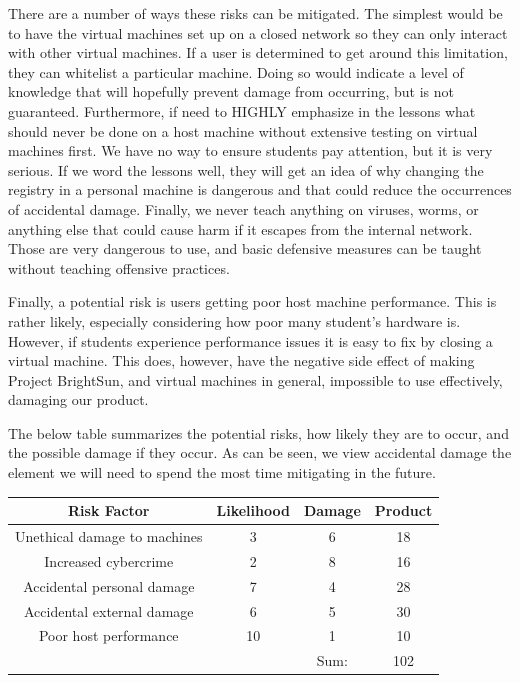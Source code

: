 \documentclass[openright]{report}
\begin{document}
\par There are a number of ways these risks can be mitigated. The simplest would be to have the virtual machines set up on a closed network so they can only interact with other virtual machines. If a user is determined to get around this limitation, they can whitelist a particular machine. Doing so would indicate a level of knowledge that will hopefully prevent damage from occurring, but is not guaranteed. Furthermore, if need to HIGHLY emphasize in the lessons what should never be done on a host machine without extensive testing on virtual machines first. We have no way to ensure students pay attention, but it is very serious. If we word the lessons well, they will get an idea of why changing the registry in a personal machine is dangerous and that could reduce the occurrences of accidental damage. Finally, we never teach anything on viruses, worms, or anything else that could cause harm if it escapes from the internal network. Those are very dangerous to use, and basic defensive measures can be taught without teaching offensive practices.

\par Finally, a potential risk is users getting poor host machine performance. This is rather likely, especially considering how poor many student's hardware is. However, if students experience performance issues it is easy to fix by closing a virtual machine. This does, however, have the negative side effect of making Project BrightSun, and virtual machines in general, impossible to use effectively, damaging our product.

The below table summarizes the potential risks, how likely they are to occur, and the possible damage if they occur. As can be seen, we view accidental damage the element we will need to spend the most time mitigating in the future.

\begin{center}
    \begin{tabular}{c | c | c | c} 
        \hline
        Risk Factor & Likelihood & Damage & Product \\ [0.5ex] 
        \hline\hline
        Unethical damage to machines & 3 & 6 & 18 \\ 
        \hline
        Increased cybercrime & 2 & 8 & 16 \\
        \hline
        Accidental personal damage & 7 & 4 & 28 \\
        \hline
        Accidental external damage & 6 & 5 & 30 \\
        \hline
        Poor host performance & 10 & 1 & 10 \\
        \hline
         &  & Sum: & 102 \\ [1ex] 
    \end{tabular}
\end{center}
\end{document}
